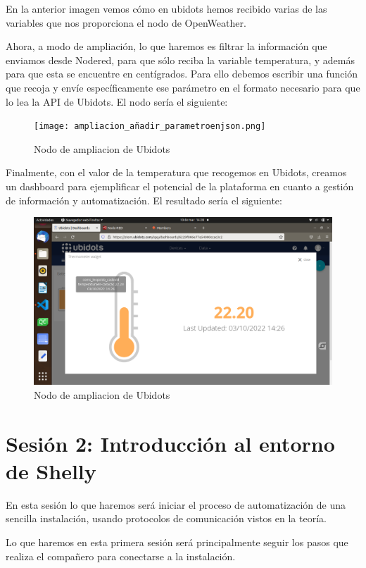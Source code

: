 \documentclass[12pt, a4paper]{article}
\begin{document}
En la anterior imagen vemos cómo en ubidots hemos recibido varias de las variables que nos proporciona el nodo de OpenWeather. 

Ahora, a modo de ampliación, lo que haremos es filtrar la información que enviamos desde Nodered, para que sólo reciba la variable temperatura, y además para que 
esta se encuentre en centígrados. Para ello debemos escribir una función que recoja y envíe específicamente ese parámetro en el formato necesario para que lo lea 
la API de Ubidots. El nodo sería el siguiente:

\begin{figure}[H]
    \centering
    \texttt{[image: ampliacion\_añadir\_parametroenjson.png]}
    \caption{Nodo de ampliacion de Ubidots}
\end{figure}

Finalmente, con el valor de la temperatura que recogemos en Ubidots, creamos un dashboard para ejemplificar el potencial de la plataforma
en cuanto a gestión de información y automatización. El resultado sería el siguiente:

\begin{figure}[H]
    \centering
    \includegraphics[scale=0.29]{Captura de pantalla de 2022-03-10 14-28-16.png}
    \caption{Nodo de ampliacion de Ubidots}
\end{figure}

\section{Sesión 2: Introducción al entorno de Shelly}

En esta sesión lo que haremos será iniciar el proceso de automatización de una sencilla instalación, usando protocolos de comunicación vistos en la teoría.
    
Lo que haremos en esta primera sesión será principalmente seguir los pasos que realiza el compañero para conectarse a la instalación.    
\end{document}
